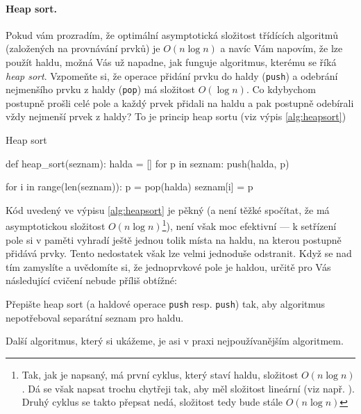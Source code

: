 \paragraph{Heap sort.} Pokud vám prozradím, že optimální asymptotická složitost třídících algoritmů (založených na provnávání prvků) je $O(n\log n)$
a navíc Vám napovím, že lze použít haldu, možná Vás už napadne, jak funguje algoritmus, kterému se říká \emph{heap sort}. Vzpomeňte si, že
operace přidání prvku do haldy ({\tt push}) a odebrání nejmenšího prvku z haldy ({\tt pop}) má složitost $O(\log n)$. Co kdybychom postupně 
prošli celé pole a každý prvek přidali na haldu a pak postupně odebírali vždy nejmenší prvek z haldy? To je princip heap sortu (viz výpis \ref{alg:heapsort})

\begin{program}\caption{Heap sort}\label{alg:heapsort}
\begin{python}
def heap_sort(seznam):
  halda = []
  for p in seznam:
    push(halda, p)
  
  for i in range(len(seznam)):
    p = pop(halda)
    seznam[i] = p
\end{python}
\end{program}

Kód uvedený ve výpisu \ref{alg:heapsort} je pěkný (a není těžké spočítat, že má asymptotickou složitost $O(n\log n)$\footnote{Tak, jak je napsaný, má první cyklus, který staví haldu, 
složitost $O(n\log n)$. Dá se však napsat trochu chytřeji tak, aby měl složitost lineární (viz např. \cite{Wirth:1985}). Druhý cyklus se takto 
přepsat nedá, složitost tedy bude stále $O(n\log n)$}), není však moc efektivní --- k setřízení pole si
v paměti vyhradí ještě jednou tolik místa na haldu, na kterou postupně přidává prvky. Tento nedostatek však lze velmi jednoduše odstranit.
Když se nad tím zamyslíte a uvědomíte si, že jednoprvkové pole je haldou, určitě pro Vás následující cvičení nebude příliš obtížné:

\begin{cviceni} Přepište heap sort (a haldové operace {\tt push} resp. {\tt push}) tak, aby algoritmus nepotřeboval separátní seznam pro haldu.
\end{cviceni}

Další algoritmus, který si ukážeme, je asi v praxi nejpoužívanějším algoritmem.

